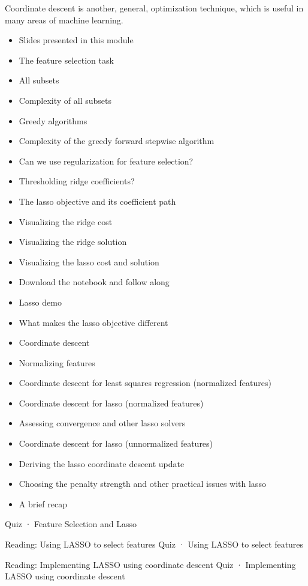 Coordinate descent is another, general, optimization technique, which is useful in many areas of machine learning.
\begin{itemize}
\item Slides presented in this module
\item The feature selection task
\item All subsets
\item Complexity of all subsets
\item Greedy algorithms
\item Complexity of the greedy forward stepwise algorithm
\item Can we use regularization for feature selection?
\item Thresholding ridge coefficients?
\item The lasso objective and its coefficient path
\item Visualizing the ridge cost
\item Visualizing the ridge solution
\item Visualizing the lasso cost and solution
\item Download the notebook and follow along
\item Lasso demo
\item What makes the lasso objective different
\item Coordinate descent
\item Normalizing features
\item Coordinate descent for least squares regression (normalized features)
\item Coordinate descent for lasso (normalized features)
\item Assessing convergence and other lasso solvers
\item Coordinate descent for lasso (unnormalized features)
\item Deriving the lasso coordinate descent update
\item Choosing the penalty strength and other practical issues with lasso
\item A brief recap
\end{itemize}
Quiz · Feature Selection and Lasso
\item Reading: Using LASSO to select features
Quiz · Using LASSO to select features
\item Reading: Implementing LASSO using coordinate descent
Quiz · Implementing LASSO using coordinate descent

